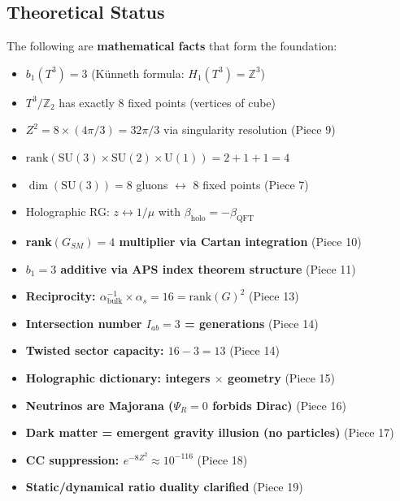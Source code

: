 \documentclass[12pt,a4paper]{article}
\newcommand{\Zsq}{Z^2}
\begin{document}
\subsection{Theoretical Status}

\begin{tcolorbox}[colback=green!10!white, colframe=green!60!black, title=What Is Established (v8.8.8)]
The following are \textbf{mathematical facts} that form the foundation:
\begin{itemize}[itemsep=0pt]
    \item[\checkmark] $b_1(T^3) = 3$ (K\"unneth formula: $H_1(T^3) = \mathbb{Z}^3$)
    \item[\checkmark] $T^3/\mathbb{Z}_2$ has exactly 8 fixed points (vertices of cube)
    \item[\checkmark] $\Zsq = 8 \times (4\pi/3) = 32\pi/3$ via singularity resolution (Piece 9)
    \item[\checkmark] $\text{rank}(\text{SU}(3) \times \text{SU}(2) \times \text{U}(1)) = 2 + 1 + 1 = 4$
    \item[\checkmark] $\dim(\text{SU}(3)) = 8$ gluons $\leftrightarrow$ 8 fixed points (Piece 7)
    \item[\checkmark] Holographic RG: $z \leftrightarrow 1/\mu$ with $\beta_{\text{holo}} = -\beta_{\text{QFT}}$
    \item[\checkmark] \textbf{rank$(G_{SM}) = 4$ multiplier via Cartan integration} (Piece 10)
    \item[\checkmark] \textbf{$b_1 = 3$ additive via APS index theorem structure} (Piece 11)
    \item[\checkmark] \textbf{Reciprocity: $\alpha^{-1}_{\text{bulk}} \times \alpha_s = 16 = \text{rank}(G)^2$} (Piece 13)
    \item[\checkmark] \textbf{Intersection number $I_{ab} = 3$ = generations} (Piece 14)
    \item[\checkmark] \textbf{Twisted sector capacity: $16 - 3 = 13$} (Piece 14)
    \item[\checkmark] \textbf{Holographic dictionary: integers $\times$ geometry} (Piece 15)
    \item[\checkmark] \textbf{Neutrinos are Majorana ($\Psi_R = 0$ forbids Dirac)} (Piece 16)
    \item[\checkmark] \textbf{Dark matter = emergent gravity illusion (no particles)} (Piece 17)
    \item[\checkmark] \textbf{CC suppression: $e^{-8\Zsq} \approx 10^{-116}$} (Piece 18)
    \item[\checkmark] \textbf{Static/dynamical ratio duality clarified} (Piece 19)

\end{itemize}
\end{tcolorbox}
\end{document}
